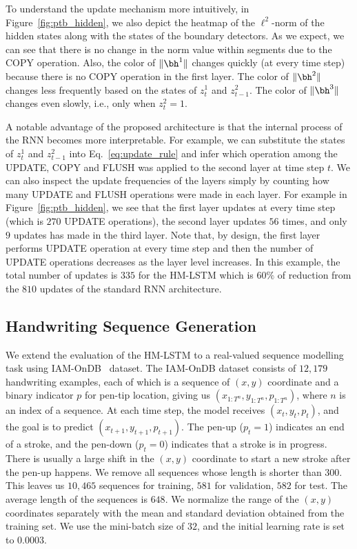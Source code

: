 To understand the update mechanism more intuitively, in Figure~\ref{fig:ptb_hidden},
we also depict the heatmap of the $\ell^2$-norm of the hidden states along with the states of the boundary detectors. As we expect, we can see that there is no change in the norm value within segments due to the COPY operation. Also, the color of $\|\bh^1\|$ changes quickly (at every time step) because there is no COPY operation in the first layer. The color of $\|\bh^2\|$ changes less frequently based on the states of $z^1_t$ and $z^2_{t-1}$. The color of $\|\bh^3\|$ changes even slowly, i.e., only when $z^2_t=1$.

A notable advantage of the proposed architecture is that the internal process of the RNN becomes more interpretable. For example, we can substitute the states of $z^1_t$ and $z^2_{t-1}$ into Eq.~\ref{eq:update_rule} 
and infer which operation among the UPDATE, COPY and FLUSH was applied to the second layer at time step $t$. We can also inspect the update frequencies of the layers simply by counting how many UPDATE and FLUSH operations were made in each layer. For example in Figure~\ref{fig:ptb_hidden}, we see that the first layer updates at every time step (which is $270$ UPDATE operations), the second layer updates $56$ times, and only $9$ updates has made in the third layer. Note that, by design, the first layer performs UPDATE operation at every time step and then the number of UPDATE operations decreases as the layer level increases. In this example, the total number of updates is $335$ for the HM-LSTM which is $60\%$ of reduction from the $810$ updates of the standard RNN architecture.

\subsection{Handwriting Sequence Generation} We extend the evaluation of the HM-LSTM to a real-valued sequence modelling task using IAM-OnDB~\citep{liwicki2005iam} dataset. The IAM-OnDB dataset consists of $12,179$ handwriting examples, each of which is a sequence of $(x,y)$ coordinate and a binary indicator $p$ for pen-tip location, giving us $(x_{1:T^n},y_{1:T^n}, p_{1:T^n})$, where $n$ is an index of a sequence. At each time step, the model receives $(x_t,y_t,p_t)$, and the goal is to predict $(x_{t+1},y_{t+1},p_{t+1})$. The pen-up ($p_t=1$) indicates an end of a stroke, and the pen-down ($p_t=0$)  indicates that a stroke is in progress. There is usually a large shift in the $(x,y)$ coordinate to start a new stroke after the pen-up happens. We remove all sequences whose length is shorter than $300$. This leaves us $10,465$ sequences for training, $581$ for validation, $582$ for test. The average length of the sequences is $648$. We normalize the range of the $(x,y)$ coordinates separately with the mean and standard deviation obtained from the training set. We use the mini-batch size of $32$, and the initial learning rate is set to $0.0003$.

